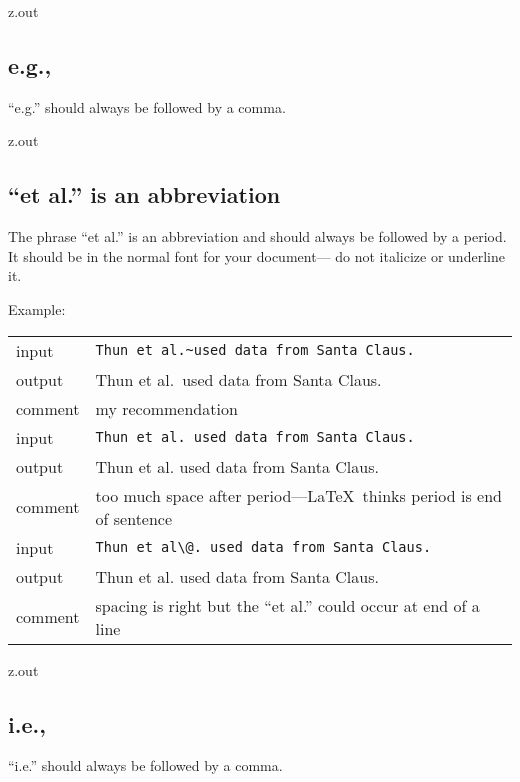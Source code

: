 \MyIO


\begin{VerbatimOut}{z.out}

\subsection{e.g.,}

``e.g.'' should always be followed by a comma.
\end{VerbatimOut}

\MyIO


\begin{VerbatimOut}{z.out}

\subsection{``et al.'' is an abbreviation}

The phrase ``et al.''
is an abbreviation
and should always be followed by a period.
It should be in the normal font for your document---%
do not italicize or underline it.

Example:\\[6pt]
\indent\indent
\begin{tabular}{@{}ll@{}}
  input&   \verb+Thun et al.~used data from Santa Claus.+\\
  output&  Thun et al.~used data from Santa Claus.\\
  comment& my recommendation\\[6pt]
  input&   \verb+Thun et al. used data from Santa Claus.+\\
  output&  Thun et al. used data from Santa Claus.\\
  comment& too much space after period---\LaTeX\ thinks period is end of sentence\\[6pt]
  input&   \verb+Thun et al\@. used data from Santa Claus.+\\
  output&  Thun et al\@. used data from Santa Claus.\\
  comment& spacing is right but the ``et al.'' could occur at end of a line\\
\end{tabular}
\end{VerbatimOut}

\MyIO


\begin{VerbatimOut}{z.out}

\subsection{i.e.,}

``i.e.'' should always be followed by a comma.
\end{VerbatimOut}

